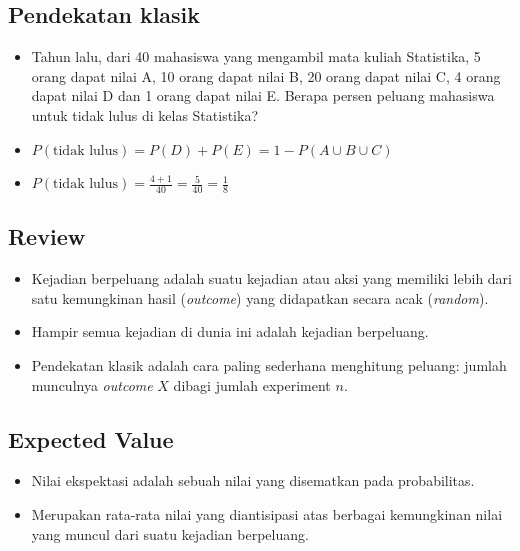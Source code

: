 \documentclass[
  letterpaper,
  DIV=11,
  numbers=noendperiod]{scrartcl}
\begin{document}
\hypertarget{pendekatan-klasik}{%
\subsection{Pendekatan klasik}\label{pendekatan-klasik}}

\begin{itemize}
\item
  Tahun lalu, dari 40 mahasiswa yang mengambil mata kuliah Statistika, 5
  orang dapat nilai A, 10 orang dapat nilai B, 20 orang dapat nilai C, 4
  orang dapat nilai D dan 1 orang dapat nilai E. Berapa persen peluang
  mahasiswa untuk tidak lulus di kelas Statistika?
\item
  \(P(\text{tidak lulus})=P(D)+P(E)=1-P(A \cup B \cup C)\)
\item
  \(P(\text{tidak lulus})=\frac{4+1}{40}=\frac{5}{40}=\frac{1}{8}\)
\end{itemize}

\hypertarget{review}{%
\subsection{Review}\label{review}}

\begin{itemize}
\item
  Kejadian berpeluang adalah suatu kejadian atau aksi yang memiliki
  lebih dari satu kemungkinan hasil (\emph{outcome}) yang didapatkan
  secara acak (\emph{random}).
\item
  Hampir semua kejadian di dunia ini adalah kejadian berpeluang.
\item
  Pendekatan klasik adalah cara paling sederhana menghitung peluang:
  jumlah munculnya \emph{outcome} \(X\) dibagi jumlah experiment \(n\).
\end{itemize}

\hypertarget{expected-value}{%
\subsection{Expected Value}\label{expected-value}}

\begin{itemize}
\item
  Nilai ekspektasi adalah sebuah nilai yang disematkan pada
  probabilitas.
\item
  Merupakan rata-rata nilai yang diantisipasi atas berbagai kemungkinan
  nilai yang muncul dari suatu kejadian berpeluang.
\end{itemize}
\end{document}
